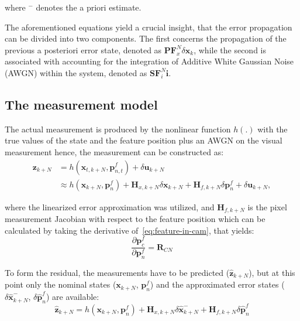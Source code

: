 where $^-$ denotes the a priori estimate.

The aforementioned equations yield a crucial insight, that the error propagation can be divided into two components. The first concerns the propagation of the previous a posteriori error state, denoted as $\mathbf{PF}_x^N\delta\mathbf{x}_k$, while the second is associated with accounting for the integration of Additive White Gaussian Noise (AWGN) within the system, denoted as $\mathbf{SF}_i^N \mathbf{i}$.

\subsection{The measurement model}

The actual measurement is produced by the nonlinear function $h(.)$ with the true values of the state and the feature position plus an AWGN on the visual measurement hence, the measurement can be constructed as:
\begin{equation}
\begin{aligned}
    \mathbf{z}_{k+N} &= h(\mathbf{x}_{t,k+N},\mathbf{p}_{n,t}^f)+\delta\mathbf{u}_{k+N}\\
    &\approx h(\mathbf{x}_{k+N},\mathbf{p}_{n}^f)+\mathbf{H}_{x,k+N}\delta\mathbf{x}_{k+N}+\mathbf{H}_{f, k+N}\delta\mathbf{p}_{n}^f + \delta\mathbf{u}_{k+N},
\end{aligned}
\end{equation}

where the linearized error approximation was utilized, and $\mathbf{H}_{f,k+N}$ is the pixel measurement Jacobian with respect to the feature position which can be calculated by taking the derivative of~\eqref{eq:feature-in-cam}, that yields:
\begin{equation}
    \frac{\partial\mathbf{p}_c^f}{\partial\mathbf{p}_n^f}=\mathbf{R}_{CN}
\end{equation}

To form the residual, the measurements have to be predicted ($\hat{\mathbf{z}}_{k+N}$), but at this point only the nominal states ($\mathbf{x}_{k+N}$, $\mathbf{p}_n^f$) and the approximated error states ($\delta\hat{\mathbf{x}}_{k+N}^-$, $\delta\hat{\mathbf{p}}_n^f$) are available:
\begin{equation}
    \hat{\mathbf{z}}_{k+N} = h(\mathbf{x}_{k+N},\mathbf{p}_{n}^f) + \mathbf{H}_{x,k+N}\delta\hat{\mathbf{x}}_{k+N}^-+\mathbf{H}_{f, k+N}\delta\hat{\mathbf{p}}_{n}^f 
\end{equation}

